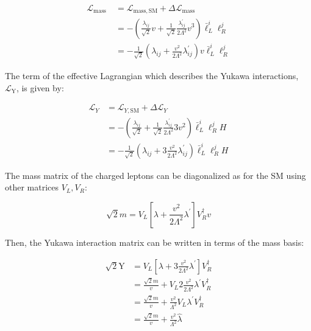 \begin{equation}
  \begin{aligned}
    \mathcal{L}_{\text {mass }} &=\mathcal{L}_{\text {mass}, \mathrm{SM}}+\Delta \mathcal{L}_{\text {mass }} \\
    &=-(\frac{\lambda_{i j}}{\sqrt{2}} v+\frac{1}{\sqrt{2}} \frac{\lambda_{i j}^{\prime}}{2 \Lambda^2} v^{3}) \bar{\ell}_{L}^{i} \ell_{R}^{j} \\
    &=-\frac{1}{\sqrt{2}}(\lambda_{i j}+\frac{v^2}{2 \Lambda^2} \lambda_{i j}^{\prime}) v \bar{\ell}_{L}^{i} \ell_{R}^{j}
  \end{aligned}
\end{equation}

The term of the effective Lagrangian which describes the Yukawa interactions, $\mathcal{L}_{\text {Y}}$, is given by:

\begin{equation}
  \begin{aligned}
    \mathcal{L}_{Y} &=\mathcal{L}_{Y, \mathrm{SM}}+\Delta \mathcal{L}_{Y} \\
    &=-(\frac{\lambda_{i j}}{\sqrt{2}}+\frac{1}{\sqrt{2}} \frac{\lambda_{i j}^{\prime}}{2 \Lambda^2} 3 v^2) \bar{\ell}_{L}^{i} \ell_{R}^{j} H \\
    &=-\frac{1}{\sqrt{2}}(\lambda_{i j}+3 \frac{v^2}{2 \Lambda^2} \lambda_{i j}^{\prime}) \bar{\ell}_{L}^{i} \ell_{R}^{j} H
  \end{aligned}
\end{equation}

The mass matrix of the charged leptons can be diagonalized as for the SM using other matrices $V_{L}, V_{R}$:

\begin{equation}
  \sqrt{2} m=V_{L}[\lambda+\frac{v^2}{2 \Lambda^2} \lambda^{\prime}] V_{R}^{\dagger} v
\end{equation}

Then, the Yukawa interaction matrix can be written in terms of the mass basis:

\begin{equation}
  \begin{aligned}
    \sqrt{2} \mathrm{Y} &=V_{L}[\lambda+3 \frac{v^2}{2 \Lambda^2} \lambda^{\prime}] V_{R}^{\dagger} \\
    &=\frac{\sqrt{2} m}{v}+V_{L} 2 \frac{v^2}{2 \Lambda^2} \lambda^{\prime} V_{R}^{\dagger} \\
    &=\frac{\sqrt{2} m}{v}+\frac{v^2}{\Lambda^2} V_{L} \lambda^{\prime} V_{R}^{\dagger} \\
    &=\frac{\sqrt{2} m}{v}+\frac{v^2}{\Lambda^2} \hat{\lambda}
  \end{aligned}
\end{equation}

